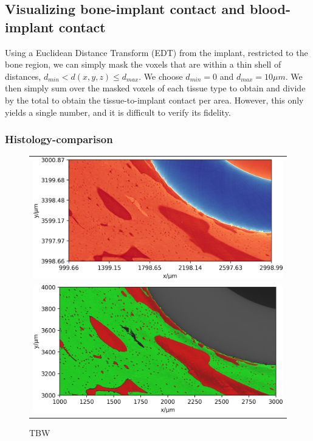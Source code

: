 \subsection{Visualizing bone-implant contact and blood-implant contact}

Using a Euclidean Distance Transform (EDT) from the implant, restricted to the
bone region, we can simply mask the voxels that are within a thin shell
of distances, $d_{min} < d(x,y,z) \le d_{max}$. We choose $d_{min} = 0$ and
$d_{max} = 10\mu m$.
We then simply sum over the masked voxels of each tissue type to obtain
and divide by the total to obtain the tissue-to-implant contact per area.
However, this only yields a single number, and it is difficult to verify
its fidelity.

\subsubsection{Histology-comparison}

\begin{figure}
  \centering
  \begin{tabular}{c}
    \includegraphics[width=\linewidth]{figures/770c_pag-bic-xy-1x} \\
    \includegraphics[width=\linewidth]{figures/770c_pag-bic-P01-xy-1x}
  \end{tabular}
  \caption{TBW}
  \label{fig:histology-comparison1}
\end{figure}

